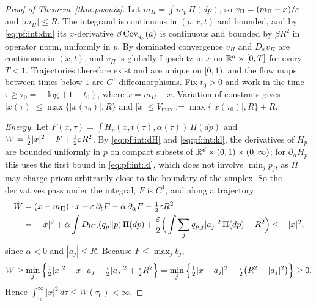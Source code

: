 \documentclass{article}
\theoremstyle{plain}
\theoremstyle{remark}
\begin{document}
\begin{proof}[Proof of Theorem~\ref{thm:posmix}]
Let $m_\Pi=\int m_p\,\Pi(dp)$, so $v_\Pi=(m_\Pi-x)/\varepsilon$ and $|m_\Pi|\le R$. The integrand is
continuous in $(p,x,t)$ and bounded, and by \eqref{eq:pf:int:dm} its $x$-derivative
$\beta\operatorname{Cov}_{q_p}(a)$ is continuous and bounded by $\beta R^2$ in operator norm, uniformly in
$p$. By dominated convergence $v_\Pi$ and $D_xv_\Pi$ are continuous in $(x,t)$, and $v_\Pi$ is
globally Lipschitz in $x$ on $\mathbb{R}^d\times[0,T]$ for every $T<1$. Trajectories therefore exist and are unique on
$[0,1)$, and the flow maps between times below $1$ are $C^1$ diffeomorphisms. Fix $t_0>0$
and work in the time $\tau\ge\tau_0=-\log(1-t_0)$, where $\dot x=m_\Pi-x$. Variation of
constants gives $|x(\tau)|\le\max\{|x(\tau_0)|,R\}$ and
$|\dot x|\le V_{\max}:=\max\{|x(\tau_0)|,R\}+R$.

\emph{Energy.} Let $F(x,\tau)=\int H_p(x,t(\tau),\alpha(\tau))\,\Pi(dp)$ and
$W=\tfrac12|x|^2-F+\tfrac12\varepsilon R^2$. By \eqref{eq:pf:int:dH} and \eqref{eq:pf:int:kl}, the
derivatives of $H_p$ are bounded uniformly in $p$ on compact subsets of
$\mathbb{R}^d\times(0,1)\times(0,\infty)$; for $\partial_\alpha H_p$ this uses the first bound in
\eqref{eq:pf:int:kl}, which does not involve $\min_jp_j$, as $\Pi$ may charge priors arbitrarily
close to the boundary of the simplex. So the derivatives pass under the integral, $F$ is $C^1$,
and along a trajectory
\begin{align*}
\dot W&=(x-m_\Pi)\cdot\dot x-\varepsilon\,\partial_tF-\dot\alpha\,\partial_\alpha F-\tfrac12\varepsilon R^2\\
&=-|\dot x|^2+\dot\alpha\int D_{\rm KL}(q_p\Vert p)\,\Pi(dp)
+\frac{\varepsilon}2\Big(\int\sum_jq_{p,j}|a_j|^2\,\Pi(dp)-R^2\Big)\le-|\dot x|^2,
\end{align*}
since $\dot\alpha<0$ and $|a_j|\le R$. Because $F\le\max_jb_j$,
\[
W\ge\min_j\Big\{\tfrac12|x|^2-x\cdot a_j+\tfrac t2|a_j|^2+\tfrac{\varepsilon}2R^2\Big\}
=\min_j\Big\{\tfrac12|x-a_j|^2+\tfrac{\varepsilon}2\big(R^2-|a_j|^2\big)\Big\}\ge0 .
\]
Hence $\int_{\tau_0}^\infty|\dot x|^2\,d\tau\le W(\tau_0)<\infty$.


\end{proof}
\end{document}

